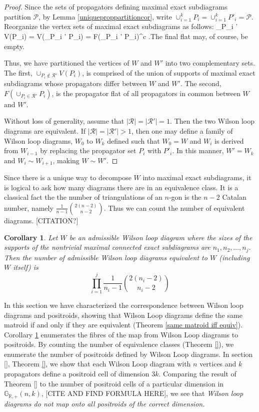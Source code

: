 \documentclass[11pt]{article}
\newcommand{\R}{\mathbb{R}}
\newcommand{\Grtnn}{\mathbb{G}_{\R, +}}
\def\ba #1\ea{\begin{align} #1 \end{align}}
\newcommand{\cP}{\mathcal{P}}
\newtheorem{cor}[thm]{Corollary}
\theoremstyle{remark}
\theoremstyle{definition}
\begin{document}
\begin{proof}
Since the sets of propagators defining maximal exact subdiagrams partition $\cP$, by Lemma \ref{uniqueproppartitioncor}, write $\cup_{i = 1}^k P_i = \cup_{i = 1}^k P'_i = \cP$. Reorganize the vertex sets of maximal exact subdiagrams as follows: \ba \cup_{P_i \not \in {}'} V(P_i) = V(\cup_{P_i \not \in {}'} P_i)  = F(\cup_{P_i \in {}'} P_i)^c\label{vertexsets}\; .\ea The final flat may, of course, be empty.

Thus, we have partitioned the vertices of $W$ and $W'$ into two complementary sets. The first, $ \cup_{P_i \not \in \mathcal{R}'} V(P_i)$,  is comprised of the union of supports of maximal exact subdiagrams whose propagators differ between $W$ and $W'$. The second, $ F(\cup_{P_i \in \mathcal{R}'} P_i)$,  is the propagator flat of all propagators in common between $W$ and $W'$.

Without loss of generality, assume that $|\mathcal{R}| = |\mathcal{R}'| = 1$. Then the two Wilson loop diagrams are equivalent. If  $|\mathcal{R}| = |\mathcal{R}'| > 1$, then one may define a family of Wilson loop diagrams, $W_0$ to $W_k$ defined such that $W_0 = W$ and $W_i$ is derived from $W_{i-1}$ by replacing the propagator set $P_i$ with $P'_i$. In this manner, $W' = W_k$ and $W_i \sim W_{i+1}$, making $W \sim W'$.
\end{proof}

Since there is a unique way to decompose $W$ into maximal exact subdiagrams, it is logical to ask how many diagrams there are in an equivalence class. It is a classical fact the the number of triangulations of an $n$-gon is the $n-2$ Catalan number, namely $\frac{1}{n-1}\binom{2(n-2)}{n-2}$.  Thus we can count the number of equivalent diagrams. [CITATION?]

\begin{cor}\label{number of equiv diagrams}
  Let $W$ be an admissible Wilson loop diagram where the sizes of the supports of the nontrivial maximal connected exact subdiagrams are $n_1, n_2, \ldots, n_j$.  Then the number of admissible Wilson loop diagrams equivalent to $W$ (including $W$ itself) is
  \[
  \prod_{i=1}^{j} \frac{1}{n_i-1}\binom{2(n_i-2)}{n_i-2}
  \]
\end{cor}

In this section we have characterized the correspondence between Wilson loop diagrams and positroids, showing that Wilson Loop diagrams define the same matroid if and only if they are equivalent (Theorem \ref{same matroid iff equiv}). Corollary \ref{number of equiv diagrams} enumerates the fibres of the map from Wilson Loop diagrams to positroids. {\color{violet} By counting the number of equivalence classes (Theorem \ref{}), we enumerate the number of positroids defined by Wilson Loop diagrams. In section \ref{}, Theorem \ref{}, we show that each Wilson Loop diagram with $n$ vertices and $k$ propagators define a positroid cell of dimension $3k$. Comparing the result of Theorem \ref{} to the number of positroid cells of a particular dimension in $\Grtnn(n, k)$, [CITE AND FIND FORMULA HERE], we see that \emph{Wilson loop diagrams do not map onto all positroids of the correct dimension.}} 
\end{document}
